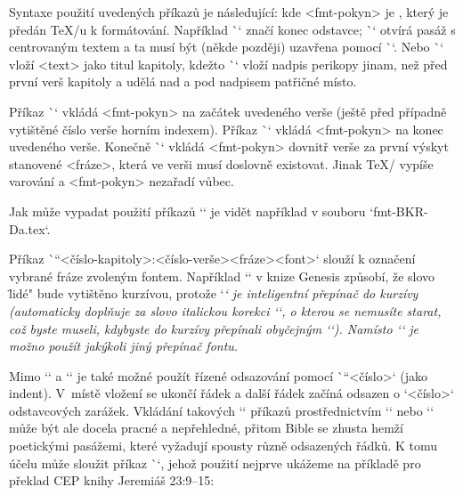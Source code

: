 Syntaxe použití uvedených příkazů je následující:
\begtt
{}
\endtt
kde <fmt-pokyn> je , který je předán \TeX/u k formátování.
Například \`\endgraf` značí konec odstavce; \`\begcenter` otvírá pasáž s
centrovaným textem a ta musí být (někde později) uzavřena pomocí \`\endcenter`. Nebo 
\`` vloží <text> jako titul kapitoly, kdežto
\`` vloží nadpis perikopy jinam, než před první verš kapitoly a udělá nad a pod nadpisem patřičné místo.

Příkaz \`\fmtpre` vkládá <fmt-pokyn>
na začátek uvedeného verše (ještě před případně vytištěné číslo verše horním
indexem). 
Příkaz \`\fmtadd` vkládá <fmt-pokyn> na konec uvedeného verše.
Konečně \`\fmtins` vkládá <fmt-pokyn> dovnitř verše za první výskyt stanovené
<fráze>, která ve verši musí doslovně existovat. Jinak \TeX/ vypíše varování
a <fmt-pokyn> nezařadí vůbec.

Jak může vypadat použití příkazů `\fmt*` je vidět například v souboru
`fmt-BKR-Da.tex`.

Příkaz \`\fmtfont``{<číslo-kapitoly>:<číslo-verše>}{<fráze>}{<font>}`
slouží k označení vybrané fráze zvoleným fontem.
Například `` v knize Genesis způsobí, že slovo
\"lidé" bude vytištěno kurzívou, protože `\em` je inteligentní přepínač do kurzívy (automaticky doplňuje za slovo italickou korekci `\/`, o kterou se nemusíte starat, což byste museli, kdybyste do kurzívy přepínali obyčejným `\it`).
Namísto `\em` je možno použít jakýkoli jiný přepínač fontu.

Mimo `\begcenter` a `\endcenter` je také možné použít řízené odsazování pomocí
\`\ind``<číslo>` (jako indent). V~místě vložení se ukončí řádek a další řádek začíná
odsazen o `<číslo>` odstavcových zarážek. Vkládání takových `\ind` příkazů
prostřednictvím `\fmtins` nebo `\fmtpre` může být ale docela pracné a
nepřehledné, přitom Bible se zhusta hemží poetickými pasážemi, které vyžadují spousty
různě odsazených řádků. K tomu účelu může sloužit příkaz \`\fmtpoetry`, jehož
použití nejprve ukážeme na příkladě pro překlad CEP knihy Jeremiáš 23:9--15:


